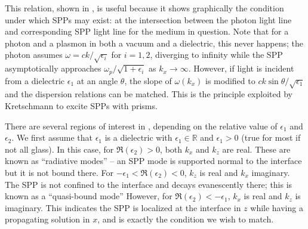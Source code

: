 \documentclass[a4paper,titlepage,onecolumn]{report}
\begin{document}
This relation, shown in , is useful because
it shows graphically the condition under which SPPs may exist: at the
intersection between the photon light line and corresponding SPP light line
for the medium in question.  Note that for a photon and a plasmon in both a
vacuum and a dielectric, this never happens; the photon assumes $\omega = c
k /\sqrt{\epsilon_i}$ for $i=1,2$, diverging to infinity while the SPP
asymptotically approaches $\omega_p/\sqrt{1+\epsilon_i}$ as $k_x\to\infty$.
However, if light is incident from a dielectric $\epsilon_1$ at an angle
$\theta$, the slope of $\omega(k_x)$ is modified to $c k \sin
\theta/\sqrt{\epsilon_1}$ and the dispersion relations can be matched.
This is the principle exploited by Kretschmann \cite{kretschmann1968} to
excite SPPs with prisms.

There are several regions of interest in ,
depending on the relative value of $\epsilon_1$ and $\epsilon_2$.  We first
assume that $\epsilon_1$ is a dielectric with $\epsilon_1\in\mathbb{R}$ and
$\epsilon_1 > 0$ (true for most if not all glass).  In this case, for
$\Re(\epsilon_2)>0$, both $k_x$ and $k_z$ are real.  These are known as
``radiative modes'' -- an SPP mode is supported normal to the interface but
it is not bound there.  For $-\epsilon_1<\Re(\epsilon_2)<0$, $k_z$ is real
and $k_x$ imaginary.  The SPP is not confined to the interface and decays
evanescently there; this is known as a ``quasi-bound mode''  However, for
$\Re(\epsilon_2)<-\epsilon_1$, $k_x$ is real and $k_z$ is imaginary.  This
indicates the SPP is localized at the interface in $z$ while having a
propagating solution in $x$, and is exactly the condition we wish to match.
\end{document}

